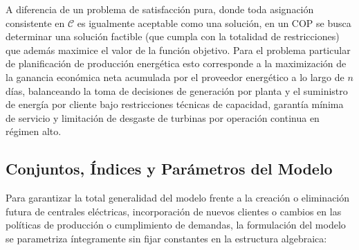 A diferencia de un problema de satisfacción pura, donde toda asignación consistente en $\mathcal{C}$ es igualmente aceptable como una solución, en un COP se busca determinar una solución factible (que cumpla con la totalidad de restricciones) que además maximice el valor de la función objetivo. Para el problema particular de planificación de producción energética esto corresponde a la maximización de la ganancia económica neta acumulada por el proveedor energético a lo largo de $n$ días, balanceando la toma de decisiones de generación por planta y el suministro de energía por cliente bajo restricciones técnicas de capacidad, garantía mínima de servicio y limitación de desgaste de turbinas por operación continua en régimen alto.

\subsection{Conjuntos, Índices y Parámetros del Modelo}

Para garantizar la total generalidad del modelo frente a la creación o eliminación futura de centrales eléctricas, incorporación de nuevos clientes o cambios en las políticas de producción o cumplimiento de demandas, la formulación del modelo se parametriza íntegramente sin fijar constantes en la estructura algebraica:

